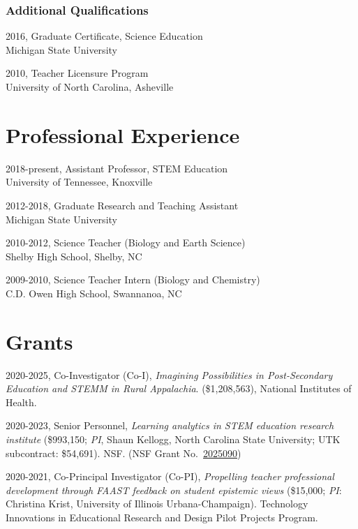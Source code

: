 \documentclass[
  14,
]{article}
\begin{document}
\hypertarget{additional-qualifications}{%
\subsubsection{Additional
Qualifications}\label{additional-qualifications}}

2016, Graduate Certificate, Science Education\\
Michigan State University

2010, Teacher Licensure Program\\
University of North Carolina, Asheville

\hypertarget{professional-experience}{%
\section{Professional Experience}\label{professional-experience}}

2018-present, Assistant Professor, STEM Education\\
University of Tennessee, Knoxville

2012-2018, Graduate Research and Teaching Assistant\\
Michigan State University

2010-2012, Science Teacher (Biology and Earth Science)\\
Shelby High School, Shelby, NC

2009-2010, Science Teacher Intern (Biology and Chemistry)\\
C.D. Owen High School, Swannanoa, NC

\hypertarget{grants}{%
\section{Grants}\label{grants}}

2020-2025, Co-Investigator (Co-I), \emph{Imagining Possibilities in
Post-Secondary Education and STEMM in Rural Appalachia}. (\$1,208,563),
National Institutes of Health.

2020-2023, Senior Personnel, \emph{Learning analytics in STEM education
research institute} (\$993,150; \emph{PI}, Shaun Kellogg, North Carolina
State University; UTK subcontract: \$54,691). NSF. (NSF Grant
No.~\href{https://www.nsf.gov/awardsearch/showAward?AWD_ID=2025090\&HistoricalAwards=false}{2025090})

2020-2021, Co-Principal Investigator (Co-PI), \emph{Propelling teacher
professional development through FAAST feedback on student epistemic
views} (\$15,000; \emph{PI}: Christina Krist, University of Illinois
Urbana-Champaign). Technology Innovations in Educational Research and
Design Pilot Projects Program.
\end{document}
